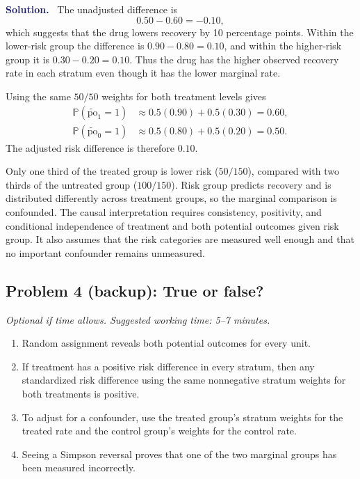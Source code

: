 \documentclass[11pt]{article}
\newif\ifsolutions
\newcommand{\Pbb}{\mathbb{P}}
\newcommand{\po}[1]{\widetilde{\mathrm{po}}_{#1}}
\newenvironment{answer}{%
    \par\medskip\noindent\textcolor{MidnightBlue}{\textbf{Solution.}}\ }
    {\par\medskip}
\newcommand{\workingspace}[1]{}
\newcommand{\workingspace}[1]{\vspace{#1}}
\begin{document}
\begin{answer}
The unadjusted difference is
\[
  0.50-0.60=-0.10,
\]
which suggests that the drug lowers recovery by 10 percentage points. Within
the lower-risk group the difference is $0.90-0.80=0.10$, and within the
higher-risk group it is $0.30-0.20=0.10$. Thus the drug has the higher observed
recovery rate in each stratum even though it has the lower marginal rate.

Using the same $50/50$ weights for both treatment levels gives
\begin{align*}
  \Pbb(\po{1}=1)&\approx0.5(0.90)+0.5(0.30)=0.60,\\
  \Pbb(\po{0}=1)&\approx0.5(0.80)+0.5(0.20)=0.50.
\end{align*}
The adjusted risk difference is therefore $0.10$.

Only one third of the treated group is lower risk ($50/150$), compared with two
thirds of the untreated group ($100/150$). Risk group predicts recovery and is
distributed differently across treatment groups, so the marginal comparison is
confounded. The causal interpretation requires consistency, positivity, and
conditional independence of treatment and both potential outcomes given risk
group. It also assumes that the risk categories are measured well enough and
that no important confounder remains unmeasured.
\end{answer}

\ifsolutions\else\newpage\fi
\subsection*{Problem 4 (backup): True or false?}
\noindent\textit{Optional if time allows. Suggested working time: 5--7 minutes.}

\begin{enumerate}[label=(\alph*),itemsep=0.55em]
  \item Random assignment reveals both potential outcomes for every unit.
  \item If treatment has a positive risk difference in every stratum, then any
        standardized risk difference using the same nonnegative stratum weights
        for both treatments is positive.
  \item To adjust for a confounder, use the treated group's stratum weights for
        the treated rate and the control group's weights for the control rate.
  \item Seeing a Simpson reversal proves that one of the two marginal groups has
        been measured incorrectly.
\end{enumerate}
\workingspace{4.5cm}
\end{document}
